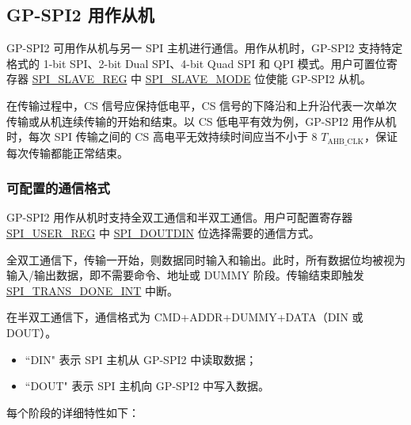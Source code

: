 \documentclass[main\_\_CN.tex]{subfiles}
\begin{document}
\subsection{GP-SPI2 用作从机}\label{sec:gp-spi2-slave-mode}

GP-SPI2 可用作从机与另一 SPI 主机进行通信。用作从机时，GP-SPI2 支持特定格式的 1-bit SPI、2-bit Dual SPI、4-bit Quad SPI 和 QPI 模式。用户可置位寄存器 \hyperref[regdesc:SPISLAVEREG]{SPI\_SLAVE\_REG} 中 \hyperref[fielddesc:SPISLAVEMODE]{SPI\_SLAVE\_MODE} 位使能 GP-SPI2 从机。

在传输过程中，CS 信号应保持低电平，CS 信号的下降沿和上升沿代表一次单次传输或从机连续传输的开始和结束。以 CS 低电平有效为例，GP-SPI2 用作从机时，每次 SPI 传输之间的 CS 高电平无效持续时间应当不小于 8
$T_{\textrm{AHB\_CLK}}$，保证每次传输都能正常结束。

\subsubsection{可配置的通信格式}\label{slave communication format}

GP-SPI2 用作从机时支持全双工通信和半双工通信。用户可配置寄存器 \hyperref[regdesc:SPIUSERREG]{SPI\_USER\_REG} 中 \hyperref[fielddesc:SPIDOUTDIN]{SPI\_DOUTDIN} 位选择需要的通信方式。

全双工通信下，传输一开始，则数据同时输入和输出。此时，所有数据位均被视为输入/输出数据，即不需要命令、地址或 DUMMY 阶段。传输结束即触发 \hyperref[int:SPITRANSDONEINT]{SPI\_TRANS\_DONE\_INT} 中断。

在半双工通信下，通信格式为 CMD+ADDR+DUMMY+DATA（DIN 或 DOUT）。
\begin{itemize}
    \item ``DIN" 表示 SPI 主机从 GP-SPI2 中读取数据；
    \item ``DOUT" 表示 SPI 主机向 GP-SPI2 中写入数据。
\end{itemize}

每个阶段的详细特性如下：
\end{document}
